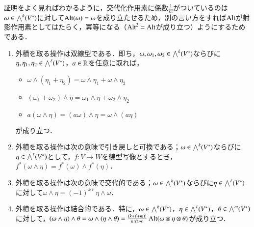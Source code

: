 \begin{dig}
証明をよく見ればわかるように，交代化作用素に係数$\frac{1}{k!}$がついているのは$\omega \in \bigwedge^k(V^*)$に対して$\operatorname{Alt}(\omega) = \omega$を成り立たせるため，別の言い方をすれば$\operatorname{Alt}$が射影作用素としてはたらく，冪等になる（$\operatorname{Alt}^2 = \operatorname{Alt}$が成り立つ）ようにするためである．
\end{dig}

\begin{prop}[外積の基本性質]
\leavevmode
\begin{enumerate}
\item 外積を取る操作は双線型である．即ち，$\omega, \omega_1, \omega_2 \in \bigwedge^k(V^*)$ならびに$\eta, \eta_1, \eta_2 \in \bigwedge^\ell(V^*)$，$a \in \mathbb{R}$を任意に取れば，
\begin{itemize}
\item $\omega \wedge (\eta_1 + \eta_2) = \omega \wedge \eta_1 + \omega \wedge \eta_2$
\item $(\omega_1 + \omega_2) \wedge \eta = \omega_1 \wedge \eta + \omega_2 \wedge \eta_2$
\item $a(\omega \wedge \eta) = (a\omega) \wedge \eta = \omega \wedge (a \eta)$
\end{itemize}が成り立つ．
\item 外積を取る操作は次の意味で引き戻しと可換である；$\omega \in \bigwedge^k(V^*)$ならびに$\eta \in \bigwedge^\ell(V^*)$として，$f \colon V \to W$を線型写像とするとき，$f^*(\omega \wedge \eta) = f^*(\omega) \wedge f^*(\eta)$．
\item 外積を取る操作は次の意味で交代的である；$\omega \in \bigwedge^k(V^*)$ならびに$\eta \in \bigwedge^\ell(V^*)$に対して$\omega \wedge \eta = (-1)^{k\ell}\eta \wedge \omega$．
\item 外積を取る操作は結合的である．特に，$\omega \in \bigwedge^k(V^*)$，$\eta \in \bigwedge^{\ell}(V^*)$，$\theta \in \bigwedge^m(V^*)$に対して，$(\omega \wedge \eta) \wedge \theta = \omega \wedge(\eta \wedge \theta) = \frac{(k+\ell+m)!}{k! \ell! m!} \operatorname{Alt}(\omega \otimes \eta \otimes \theta)$が成り立つ．
\end{enumerate}
\end{prop}

